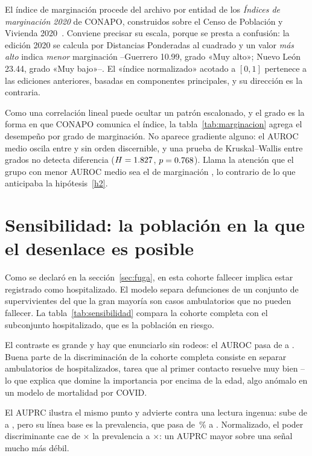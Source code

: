 El índice de marginación procede del archivo por entidad de los \emph{Índices de
marginación 2020} de CONAPO, construidos sobre el Censo de Población y Vivienda
2020~\parencite{conapo2020}. Conviene precisar su escala, porque se presta a
confusión: la edición 2020 se calcula por Distancias Ponderadas al cuadrado y un
valor \emph{más alto} indica \emph{menor} marginación --Guerrero 10.99, grado
«Muy alto»; Nuevo León 23.44, grado «Muy bajo»--. El «índice normalizado» acotado
a $[0,1]$ pertenece a las ediciones anteriores, basadas en componentes
principales, y su dirección es la contraria.

Como una correlación lineal puede ocultar un patrón escalonado, y el grado es la
forma en que CONAPO comunica el índice, la tabla~\ref{tab:marginacion} agrega el
desempeño por grado de marginación. No aparece gradiente alguno: el AUROC medio
oscila entre \gradoAurocMin{} y \gradoAurocMax{} sin orden discernible, y una
prueba de Kruskal--Wallis entre grados no detecta diferencia ($H=1.827$,
$p=0.768$). Llama la atención que el grupo con menor AUROC medio sea el de
marginación \emph{\gradoPeor}, lo contrario de lo que anticipaba la
hipótesis~\ref{h2}.



\section{Sensibilidad: la población en la que el desenlace es posible}
\label{sec:sensibilidad_res}

Como se declaró en la sección~\ref{sec:fuga}, en esta cohorte fallecer implica
estar registrado como hospitalizado. El modelo separa 
defunciones de un conjunto de supervivientes del que la gran mayoría son casos
ambulatorios que no pueden fallecer. La tabla~\ref{tab:sensibilidad} compara la
cohorte completa con el subconjunto hospitalizado, que es la población en riesgo.



El contraste es grande y hay que enunciarlo sin rodeos: el AUROC pasa de
\aurocGlobal{} a \hospAUROC. Buena parte de la discriminación de la cohorte
completa consiste en separar ambulatorios de hospitalizados, tarea que
\texttt{\impPrimeraVar} al primer contacto resuelve muy bien --lo que explica que
domine la importancia por encima de la edad, algo anómalo en un modelo de
mortalidad por COVID.

El AUPRC ilustra el mismo punto y advierte contra una lectura ingenua: sube de
\auprcGlobal{} a \hospAUPRC, pero su línea base es la prevalencia, que pasa de
\cohorteTasaDef\,\% a \hospPrev. Normalizado, el poder discriminante cae de
\completaLift$\times$ la prevalencia a \hospLift$\times$: un AUPRC mayor sobre una
señal mucho más débil.

